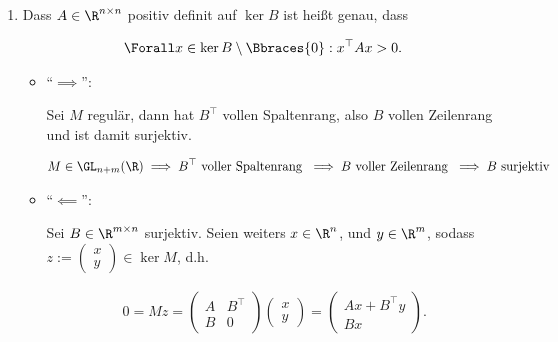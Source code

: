 \begin{solution}
\begin{enumerate}[label = \textbf{\alph*)}]
  \begin{comment}

    \item Let $B$ be regular, then the $m$ lower rows of $M$ must be linearly independent,
    which implies $\ran(B) = \R^m$. \\
    Conversely, suppose $M\cdot x = 0$ for $x \neq 0$. This implies $(x_1,\dots,x_n) \in \ker(B)$.
    Since $A$ is positive definite on $\ker$

  \end{comment}

  \item Dass $A \in \R^{n \times n}$ positiv definit auf $\ker B$ ist heißt genau, dass

  \begin{align*}
    \Forall x \in \ker B \setminus \Bbraces{0}:
      x^\top A x > 0.
  \end{align*}

  \begin{itemize}

    \item \enquote{$\implies$}:

    Sei $M$ regulär, dann hat $B^\top$ vollen Spaltenrang, also $B$ vollen Zeilenrang und ist damit surjektiv.

    \begin{align*}
      M \in \GL_{n+m}(\R)
      \implies
      B^\top ~\text{voller Spaltenrang}~
      \implies
      B ~\text{voller Zeilenrang}~
      \implies
      B ~\text{surjektiv}
    \end{align*}

    \item \enquote{$\impliedby$}:

    Sei $B \in \R^{m \times n}$ surjektiv.
    Seien weiters $x \in \R^n$, und $y \in \R^m$, sodass $z := \begin{pmatrix} x \\ y \end{pmatrix} \in \ker M$, d.h.

    \begin{align*}
      0
      =
      M z
      =
      \begin{pmatrix}
        A & B^\top \\
        B & 0
      \end{pmatrix}
      \begin{pmatrix}
        x \\ y
      \end{pmatrix}
      =
      \begin{pmatrix}
        A x + B^\top y \\
        B x
      \end{pmatrix}.
    \end{align*}


\end{itemize}
\end{enumerate}
\end{solution}
